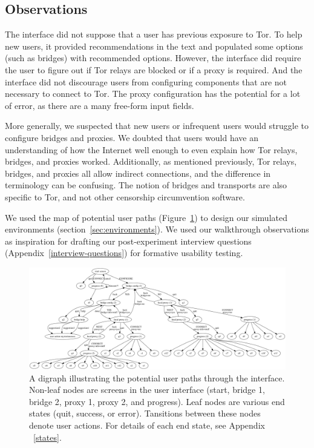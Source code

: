 \documentclass[USenglish,oneside,twocolumn]{article}
\begin{document}
\subsection{Observations}
The interface did not suppose that a user has previous exposure to Tor. To help new users, it provided recommendations in the text and populated some options (such as bridges) with recommended options. However, the interface did require the user to figure out if Tor relays are blocked or if a proxy is required. And the interface did not discourage users from configuring components that are not necessary to connect to Tor. The proxy configuration has the potential for a lot of error, as there are a many free-form input fields. 

More generally, we suspected that new users or infrequent users would struggle to configure bridges and proxies. We doubted that users would have an understanding of how the Internet well enough to even explain how Tor relays, bridges, and proxies worked. Additionally, as mentioned previously, Tor relays, bridges, and proxies all allow indirect connections, and the difference in terminology can be confusing. The notion of bridges and transports are also specific to Tor, and not other censorship circumvention software. 

We used the map of potential user paths (Figure~\ref{fig:digraph}) to design our simulated environments (section~\ref{sec:environments}).  We used our walkthrough observations as inspiration for drafting our post-experiment interview questions (Appendix~\ref{interview-questions}) for formative usability testing. 

\begin{figure}
\centering
\includegraphics[width=\textwidth]{tor-digraph.png}
\caption{
A digraph illustrating the potential user paths through the interface. Non-leaf nodes are screens in the user interface (start, bridge 1, bridge 2, proxy 1, proxy 2, and progress). Leaf nodes are various end states (quit, success, or error). Tansitions between these nodes denote user actions. For details of each end state, see Appendix ~\ref{states}. 
}
\label{fig:digraph}
\end{figure} 
\end{document}
